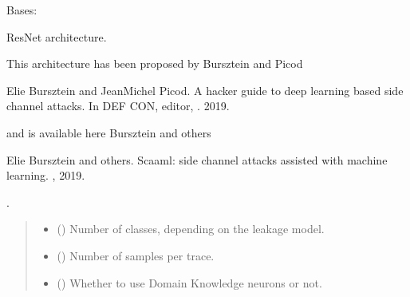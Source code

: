 \documentclass[letterpaper,10pt,english]{sphinxmanual}
\begin{document}

\begin{fulllineitems}
\label{\detokenize{MLSCAlib.Architectures:MLSCAlib.Architectures.torch_models.ResNet}}
\pysigstartsignatures
{}
\pysigstopsignatures
\sphinxAtStartPar
Bases: 

\sphinxAtStartPar
ResNet architecture.

\sphinxAtStartPar
This architecture has been proposed by Bursztein and Picod%
\begin{footnote}[9]\sphinxAtStartFootnote
Elie Bursztein and Jean\sphinxhyphen{}Michel Picod. A hacker guide to deep learning based side channel attacks. In DEF CON, editor, . 2019.
%
\end{footnote} and is
available here Bursztein and others%
\begin{footnote}[10]\sphinxAtStartFootnote
Elie Bursztein and others. Scaaml: side channel attacks assisted with machine learning. , 2019.
%
\end{footnote}.
\begin{quote}\begin{description}
\begin{itemize}
\item {} 
\sphinxAtStartPar
{} () \textendash{} Number of classes, depending on the leakage model.

\item {} 
\sphinxAtStartPar
{} () \textendash{} Number of samples per trace.

\item {} 
\sphinxAtStartPar
{} (\sphinxstyleliteralemphasis{\sphinxupquote{, }}) \textendash{} Whether to use Domain Knowledge neurons or not.


\end{itemize}
\end{description}
\end{quote}
\end{fulllineitems}
\end{document}
